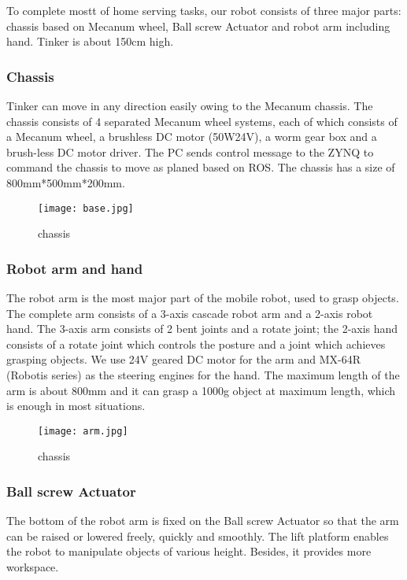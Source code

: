 To complete mostt of home serving tasks, our robot consists of three major parts: chassis based on Mecanum wheel, Ball screw Actuator and robot arm including hand. Tinker is about 150cm high. 
\subsubsection{Chassis}
Tinker can move in any direction easily owing to the Mecanum chassis. The chassis consists of 4 separated Mecanum wheel systems, each of which consists of a Mecanum wheel, a brushless DC motor (50W24V), a worm gear box and a brush-less DC motor driver. The PC sends control message to the ZYNQ to command the chassis to move as planed based on ROS. The chassis has a size of 800mm*500mm*200mm.
\begin{figure}[H]
    \texttt{[image: base.jpg]}
    \caption{chassis}
\end{figure}

\subsubsection{Robot arm and hand}
The robot arm is the most major part of the mobile robot, used to grasp objects. The complete arm consists of a 3-axis cascade robot arm and a 2-axis robot hand. The 3-axis arm consists of 2 bent joints and a rotate joint; the 2-axis hand consists of a rotate joint which controls the posture and a joint which achieves grasping objects. We use 24V geared DC motor for the arm and MX-64R (Robotis series) as the steering engines for the hand. The maximum length of the arm is about 800mm and it can grasp a 1000g object at maximum length, which is enough in most situations. 
\begin{figure}[H]
    \texttt{[image: arm.jpg]}
    \caption{chassis}
\end{figure}

\subsubsection{Ball screw Actuator}
The bottom of the robot arm is fixed on the Ball screw Actuator so that the arm can be raised or lowered freely, quickly and smoothly. The lift platform enables the robot to manipulate objects of various height. Besides, it provides more workspace.


